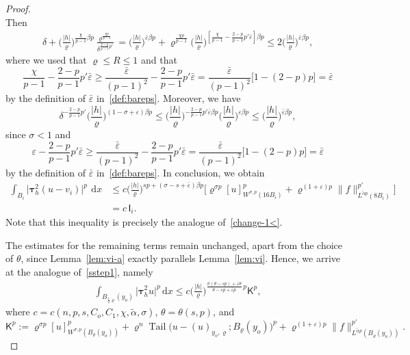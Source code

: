\documentclass[10pt,letterpaper]{amsart}
\theoremstyle{definition}
\numberwithin{theorem}{section}
\numberwithin{equation}{section}
\newcommand{\1}{\ensuremath{\mathds{1}}}
\newcommand{\dx}{\mathrm{d}x}
\newcommand\sfK{{\boldsymbol{\mathsf K}}}
\newcommand\sfI{{\boldsymbol{\mathsf I}}}
\renewcommand{\epsilon}{\varepsilon}
\renewcommand{\rho}{\varrho}
\renewcommand{\epsilon}{\varepsilon}
\renewcommand{\rho}{\varrho}
\renewcommand{\d}{\:\! \mathrm{d}}
\DeclareMathOperator{\Tail}{Tail}
\numberwithin{equation}{section}
\begin{document}
\begin{proof}
\[\]
Then
\begin{align*}
    \delta +
    \Big(\frac{|h|}{\rho}\Big)^{\frac{\chi}{p-1}\beta p} \frac{\rho^{\frac{\chi p}{p-1}}}{\delta^{\frac{2-p}{p-1}p'}}
    =
    \Big(\frac{|h|}{\rho}\Big)^{\bar\epsilon\beta p} +
    \rho^{\frac{\chi p}{p-1}} \Big(\frac{|h|}{\rho}\Big)^{[\frac{\chi}{p-1}-\frac{2-p}{p-1}p'\bar\epsilon]\beta p}
    \le 
    2\Big(\frac{|h|}{\rho}\Big)^{\bar\epsilon\beta p},
\end{align*}
where we used that \(\rho \le R \le 1\) and that
$$
    \frac{\chi}{p-1}-\frac{2-p}{p-1}p'\bar\epsilon
    \ge 
    \frac{\bar\epsilon}{(p-1)^2}-\frac{2-p}{p-1}p'\bar\epsilon
    =
    \frac{\bar\epsilon}{(p-1)^2} \big[1-(2-p)p\big]
    =
    \bar\epsilon
$$
by the definition of \(\bar\epsilon\) in~\eqref{def:bareps}. Moreover, we have 
$$
    \delta^{-\frac{2-p}{p-1}p'}\Big(\frac{|h|}{\rho}\Big)^{(1-\sigma+\epsilon)\beta p}
    \le  
    \Big(\frac{|h|}{\rho}\Big)^{-\frac{2-p}{p-1}p'\bar\epsilon\beta p} \Big(\frac{|h|}{\rho}\Big)^{\epsilon\beta p}
    \le 
    \Big(\frac{|h|}{\rho}\Big)^{\bar\epsilon\beta p},
$$
since \(\sigma<1\) and 
$$
    \epsilon-\frac{2-p}{p-1}p'\bar\epsilon
    \ge 
    \frac{\bar\epsilon}{(p-1)^2}-\frac{2-p}{p-1}p'\bar\epsilon
    =
    \frac{\bar\epsilon}{(p-1)^2} \big[1-(2-p)p\big]
    =
    \bar\epsilon
$$
by the definition of \(\bar\epsilon\) in~\eqref{def:bareps}.
In conclusion, we obtain
\begin{align*}
    \int_{B_i} \big|\boldsymbol\tau_h^2 (u - v_i)\big|^p \,\d x
    &\le
    c \Big(\frac{|h|}{\rho}\Big)^{sp+(\sigma-s+\bar\epsilon)\beta p} 
    \Big[ \rho^{\sigma p}[u]_{W^{\sigma,p}(16B_i)}^p +
    \rho^{(1+\epsilon)p}
    \|f\|_{L^{\tilde\alpha p}(8B_i)}^{p'} \Big] \\
    &=
    c\, \sfI_i .
\end{align*}
Note that this inequality is precisely the analogue of~\eqref{change-1<}.

The estimates for the remaining terms remain unchanged, apart from the choice of $\theta$, 
since Lemma~\ref{lem:vi-a} exactly parallels Lemma~\ref{lem:vi}. 
Hence, we arrive at the analogue of~\eqref{sstep1}, namely 
\begin{align*}
    \int_{B_{\frac12 \rho}(y_o)} \big|\boldsymbol\tau_h^2 u\big|^p \,\dx
    \le
    c \Big(\frac{|h|}{\rho}\Big)^{\frac{\sigma(\theta-sp)+\bar\epsilon\theta}{\theta-sp+\bar\epsilon p}\, p}
    \sfK^p,
\end{align*}
where $c=c(n,p,s,C_o,C_1,\chi,\tilde\alpha,\sigma)$, $\theta=\theta(s,p)$, and
\begin{equation*}
    \sfK^p
    :=
    \rho^{\sigma p}[u]_{W^{\sigma,p}(B_{\rho}(y_o))}^p + 
    \rho^{n}\Tail\big(u-(u)_{y_o,\rho};B_\rho(y_o)\big)^p + \rho^{(1+\epsilon) p}\|f\|_{L^{\tilde\alpha p}(B_\rho(y_o))}^{p'}.
\end{equation*}


\end{proof}
\end{document}
